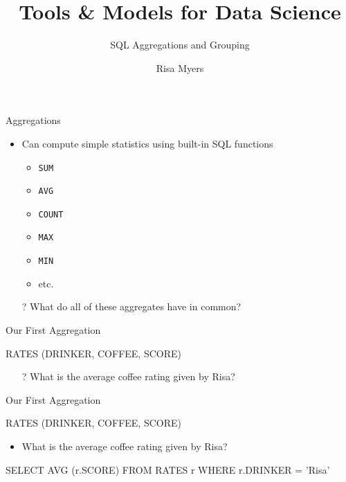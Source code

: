 \documentclass[aspectratio=169]{beamer}
\title[]
{Tools \& Models for Data Science}
\subtitle{SQL Aggregations and Grouping}
\author[]{Risa Myers}
\institute
{
  Rice University
}
\date[]{}
\begin{document}
\begin{frame}
 \titlepage
\end{frame}

\begin{frame}{Aggregations}

\begin{itemize}
\item Can compute simple statistics using built-in SQL functions
	\begin{itemize}
	\item \texttt{SUM}
	\item \texttt{AVG}
	\item \texttt{COUNT}
	\item \texttt{MAX}
	\item \texttt{MIN}
	\item etc.
	\end{itemize}
\item[?] What do all of these aggregates have in common?
\end{itemize}
\end{frame}

\begin{frame}{Our First Aggregation}

RATES (DRINKER, COFFEE, SCORE)

\begin{itemize}
\item[?]  What is the average coffee rating given by Risa?
\end{itemize}
\end{frame}

\begin{frame}[fragile]{Our First Aggregation}

RATES (DRINKER, COFFEE, SCORE)

\begin{itemize}
\item What is the average coffee rating given by Risa?
\end{itemize}

\begin{SQL}
SELECT AVG (r.SCORE)
FROM RATES r
WHERE r.DRINKER = 'Risa'
\end{SQL}
\end{frame}

\end{document}
